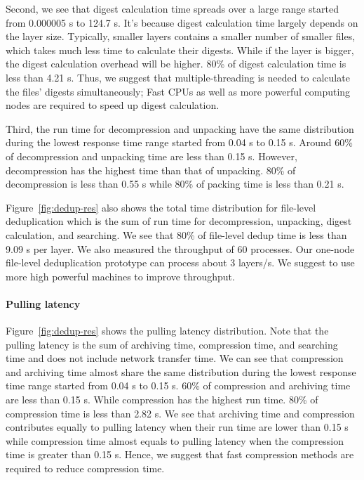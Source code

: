 Second, we see that digest calculation time spreads over a large range started
from 0.000005 s to 124.7 s. 
%
It's because digest calculation time largely
depends on the layer size. 
%
Typically, smaller layers contains a smaller number
of smaller files, which takes much less time to calculate their digests. 
%
While
if the layer is bigger, the digest calculation overhead will be higher. 
%
80\% of
digest calculation time is less than 4.21 s. 
%
Thus, we suggest that multiple-threading is needed to calculate the files'
digests simultaneously; 
%
Fast CPUs as well as more powerful computing nodes are
required to speed up digest calculation.

Third, the run time for decompression and unpacking have the same distribution
during the lowest response time range started from 0.04 s to 0.15 s. 
%
Around
60\% of decompression and unpacking time are less than 0.15 s. 
%
However,
decompression has the highest time than that of unpacking. 
%
80\% of
decompression is less than 0.55 s while 80\% of packing time is less than 0.21 s. 

Figure~\ref{fig:dedup-res} also shows the total time distribution for
file-level deduplication which is the sum of run time for decompression, unpacking,
digest calculation, and searching. 
%
We see that 80\% of file-level dedup time is
less than 9.09 s per layer.
%
%
We also measured the throughput of 60 processes. 
%
Our one-node file-level
deduplication prototype can process about 3 layers/s. 
%
We suggest to use more
high powerful machines to improve throughput.

\paragraph{Pulling latency} Figure~\ref{fig:dedup-res} shows the pulling latency
distribution. 
%
Note that the pulling latency is the sum of archiving time,
compression time, and searching time and does not include network transfer
time. 
%
We can see that compression and archiving time almost share the same
distribution during the lowest response time range started from 0.04 s to 0.15
s. 60\% of compression and archiving time are less than 0.15 s.
%
While
compression has the highest run time. 
%
80\% of compression time is less than 2.82 s. 
%
We see that archiving time and compression contributes equally to pulling
latency when their run time are lower than 0.15 s while compression time almost
equals to pulling latency when the compression time is greater than 0.15 s. 
%
Hence, we
suggest that fast compression methods are required to reduce compression time.  
%


